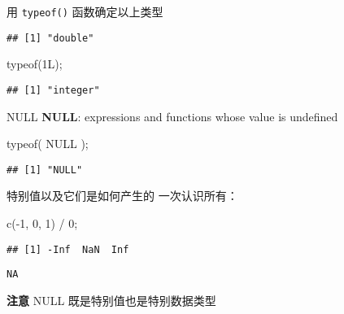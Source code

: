 \documentclass[ignorenonframetext,]{beamer}
\newenvironment{Shaded}{\begin{snugshade}}{\end{snugshade}}
\newcommand{\ConstantTok}[1]{\textcolor[rgb]{0.00,0.00,0.00}{#1}}
\newcommand{\DecValTok}[1]{\textcolor[rgb]{0.00,0.00,0.81}{#1}}
\newcommand{\FunctionTok}[1]{\textcolor[rgb]{0.00,0.00,0.00}{#1}}
\newcommand{\NormalTok}[1]{#1}
\newcommand{\SpecialCharTok}[1]{\textcolor[rgb]{0.00,0.00,0.00}{#1}}
\newcommand\FontSmall{\fontsize{7}{8}\selectfont}
\newcommand\FontNormal{\fontsize{10}{10}\selectfont}
\begin{document}
\begin{frame}[fragile]{用 \texttt{typeof()} 函数确定以上类型}
\begin{verbatim}
## [1] "double"
\end{verbatim}

\begin{Shaded}
\begin{Highlighting}[]
\FunctionTok{typeof}\NormalTok{(1L);}
\end{Highlighting}
\end{Shaded}

\begin{verbatim}
## [1] "integer"
\end{verbatim}
\end{frame}

\begin{frame}[fragile]{NULL}
\protect\hypertarget{null}{}
\textbf{NULL}: expressions and functions whose value is undefined

\FontSmall

\begin{Shaded}
\begin{Highlighting}[]
\FunctionTok{typeof}\NormalTok{( }\ConstantTok{NULL}\NormalTok{ );}
\end{Highlighting}
\end{Shaded}

\begin{verbatim}
## [1] "NULL"
\end{verbatim}
\end{frame}

\begin{frame}[fragile]{特别值以及它们是如何产生的}
\protect\hypertarget{ux7279ux522bux503cux4ee5ux53caux5b83ux4eecux662fux5982ux4f55ux4ea7ux751fux7684}{}
一次认识所有：

\FontSmall

\begin{Shaded}
\begin{Highlighting}[]
\FunctionTok{c}\NormalTok{(}\SpecialCharTok{{-}}\DecValTok{1}\NormalTok{, }\DecValTok{0}\NormalTok{, }\DecValTok{1}\NormalTok{) }\SpecialCharTok{/} \DecValTok{0}\NormalTok{;}
\end{Highlighting}
\end{Shaded}

\begin{verbatim}
## [1] -Inf  NaN  Inf
\end{verbatim}

\texttt{NA}

\FontNormal

\textbf{注意} NULL 既是特别值也是特别数据类型
\end{frame}
\end{document}
